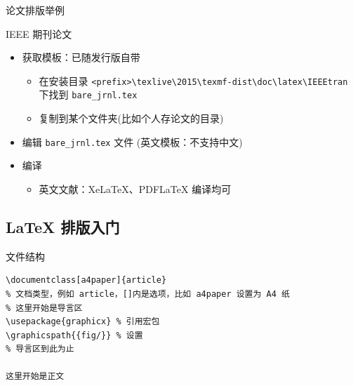 \begin{frame}[fragile]{论文排版举例}
  \begin{exampleblock}{IEEE 期刊论文}
    \begin{itemize}
      \item 获取模板：已随发行版自带
        \begin{itemize}
          \item 在安装目录 \verb|<prefix>\texlive\2015\texmf-dist\doc\latex\IEEEtran|
            下找到 \verb|bare_jrnl.tex|
          \item 复制到某个文件夹(比如个人存论文的目录)
        \end{itemize}
      \item 编辑 \verb|bare_jrnl.tex| 文件 (英文模板：不支持中文)
      \item 编译
        \begin{itemize}
          \item 英文文献：XeLaTeX、PDFLaTeX 编译均可
        \end{itemize}
    \end{itemize}
  \end{exampleblock}
\end{frame}

\subsection{\LaTeX{} 排版入门}

\begin{frame}[fragile]{文件结构}
  \lstset{language=[LaTeX]TeX}
  \begin{lstlisting}[basicstyle=\ttfamily]
\documentclass[a4paper]{article}
% 文档类型，例如 article，[]内是选项，比如 a4paper 设置为 A4 纸
% 这里开始是导言区
\usepackage{graphicx} % 引用宏包
\graphicspath{{fig/}} % 设置
% 导言区到此为止

这里开始是正文

  \end{lstlisting}
\end{frame}

